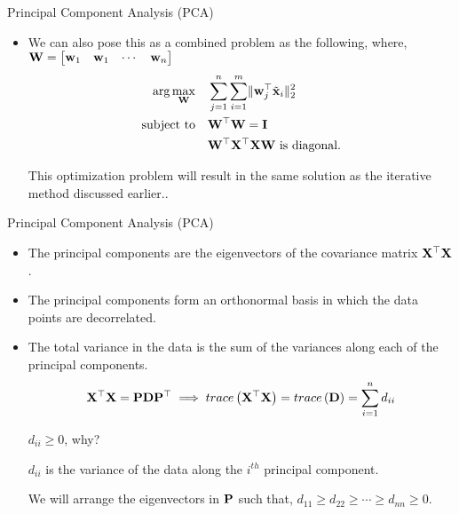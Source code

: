 \documentclass[aspectratio=169]{beamer}
\let\olditem\item
\renewcommand{\item}{\setlength{\itemsep}{\fill}\olditem}
\def\mf{\ensuremath\mathbf}
\def\lp{\ensuremath\left(}
\def\rp{\ensuremath\right)}
\def\bmx{\ensuremath\begin{bmatrix*}[r]}
\def\emx{\ensuremath\end{bmatrix*}}
\begin{document}
\begin{frame}[t]{Principal Component Analysis (PCA)}
\begin{itemize}
  \item We can also pose this as a combined problem as the following, where, $\mf{W} = \bmx \mf{w}_1 & \mf{w}_1 & \cdots & \mf{w}_n\emx$ 
  \begin{align*}
    \arg\underset{\mf{W}}{\max}  \quad & \sum_{j=1}^n \sum_{i=1}^m \lVert \mf{w}_j^\top\tilde{\mf{x}}_i \rVert_2^2 \\
      \text{subject to} \quad & \mf{W}^\top\mf{W} = \mf{I}\\
      & \mf{W}^\top\mf{X}^\top\mf{X}\mf{W} \text{ is diagonal.} 
  \end{align*}

  This optimization problem will result in the same solution as the iterative method discussed earlier..
\end{itemize}
\end{frame}


\begin{frame}[t]{Principal Component Analysis (PCA)}
\begin{itemize}
  \item The principal components are the eigenvectors of the covariance matrix $\mf{X}^\top\mf{X}$.
  
  \item The principal components form an orthonormal basis in which the data points are decorrelated.
  
  \item The total variance in the data is the sum of the variances along each of the principal components.
  \[ \mf{X}^\top\mf{X} = \mf{P} \mf{D} \mf{P}^\top \implies trace\lp \mf{X}^\top\mf{X} \rp = trace\lp \mf{D} \rp = \sum_{i=1}^n d_{ii} \]
  
  $d_{ii} \geq 0$, why? 
  
  $d_{ii}$ is the variance of the data along the $i^{th}$ principal component.

  We will arrange the eigenvectors in $\mf{P}$ such that, $d_{11} \geq d_{22} \geq \cdots \geq d_{nn} \geq 0$.
\end{itemize}
\end{frame}
\end{document}
